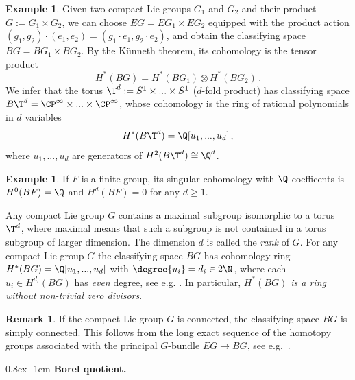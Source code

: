 \documentclass[11pt,a4paper,reqno]{article}
\makeatletter
\renewcommand{\paragraph}{%
  \@startsection{paragraph}{4}{\z@}%
  {0.8ex}  %
  {-1em}   %
  {\normalfont\bfseries}%
}
\numberwithin{equation}{section}
\theoremstyle{definition}
\newtheorem{remark}[theorem]{Remark}
\newtheorem{example}[theorem]{Example}
\makeatother
\begin{document}
\begin{example}\label{torus}
Given two compact Lie groups $G_1$ and $G_2$ and their product $G:=G_1\times G_2$, we can choose $EG=EG_1\times EG_2$ equipped with the product action $(g_1,g_2)\cdot(e_1,e_2)=(g_1\cdot e_1,g_2\cdot e_2)$, and obtain the classifying space $BG=BG_1\times BG_2$. By the K\"unneth theorem, its cohomology is the tensor product
\begin{equation}\label{kunneth}
H^*(BG)=H^*(BG_1)\otimes H^*(BG_2) \, .
\end{equation}
We infer that the torus 
$\T^d := S^1 \times...\times S^1 $ 
($d$-fold product) has classifying space 
$ B \T^d = 
\CP^\infty \times... \times \CP^\infty $, 
whose cohomology is the ring of rational polynomials in $d$ variables
\begin{equation}\label{anntoro}
H^*(B\T^d) = \Q[u_1,...,u_d] \, ,
\end{equation}
where $u_1,...,u_d$ are generators of $H^2(B\T^d)\cong\Q^d$.
\end{example}

\begin{example}\label{ex:BF}
    If $F$ is a  finite group, its singular cohomology with $\Q$ coefficents is 
$  H^0(BF)=
            \Q $
            and 
           $ H^d(BF)= 
            0 $
            for any $ d \geq 1 $. 
\end{example}
Any compact Lie group $G$ contains a maximal subgroup isomorphic to a torus $\T^d$, where maximal means that such a subgroup is not contained in a torus subgroup of larger dimension. The dimension $d$ is called the {\it rank} of $G$. For any compact Lie group $G$ the classifying space $BG$ has cohomology ring 
$  H^*(BG)=\Q[u_1,...,u_d] $ 
with $ \degree{u_i}=d_i\in 2 \N $, 
where each $u_i\in H^{d_i}(BG)$ has {\it even} degree, see e.g.  \cite[Theorem 6.22]{M2010}. In particular, {\it $H^*(BG)$ is a ring without non-trivial zero divisors}.

\begin{remark}\label{rem:conne}
If  the compact Lie group $G$ is connected, the classifying space 
$ BG$ is simply connected. 
This follows from the long exact sequence of the homotopy groups associated with the principal $G$-bundle $EG\to BG$, see e.g.~\cite[Theorem~4.41]{Hatcher:2002aa}.
\end{remark}

\paragraph{\bf Borel quotient.}  
\end{document}
